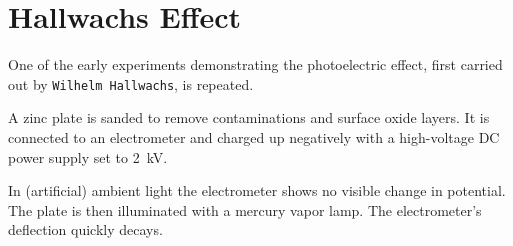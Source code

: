 \chapter{Hallwachs Effect}

One of the early experiments demonstrating the photoelectric effect, first carried out by \texttt{Wilhelm Hallwachs}, is repeated.

A zinc plate is sanded to remove contaminations and surface oxide layers.
It is connected to an electrometer and charged up negatively with a high-voltage DC power supply set to \SI{2}{\kV}.

In (artificial) ambient light the electrometer shows no visible change in potential.
The plate is then illuminated with a mercury vapor lamp.
The electrometer's deflection quickly decays.

